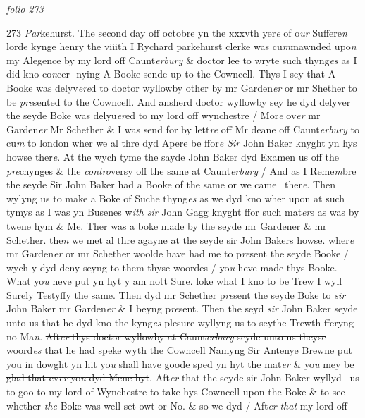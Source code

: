 \documentclass[12pt, a4paper]{book}
\begin{document}
\textit{folio 273}



{\color{Mahogany}273} 
				\marginpar[\vspace{0.5cm}{\textcolor{Gray}{E.}}]{}
			\textit{ Par}kehurst.  The second day off octobre yn the xxxvth yer\textit{e} of o\textit{ur }Suffere\textit{n} lorde kynge henry the viiith I Rychard parkehurst clerke was cu\textit{m}mawnded upo\textit{n} my Alegence by my lord off Caunt\textit{erbury }\& doctor lee to wryte such thyng\textit{es} as I did kno co\textit{n}cer- nying A Booke sende up to the Cowncell. Thys I sey that A Booke was delyv\textit{ere}d to doctor wyllowby other by mr Garden\textit{er} or mr Shether to be \textit{pre}sented to the Cowncell. And ansherd doctor wyllowby sey \sout{he dyd}
               \sout{delyver} the seyde Boke was delyu\textit{er}ed to my lord off wynchestre / Mor\textit{e} ov\textit{er} mr Garden\textit{er} Mr Schether \& I was send for by lett\textit{re} off Mr deane off Caunt\textit{erbury} to cu\textit{m} to london wher we al thre dyd Apere be ffor\textit{e Sir} John Baker knyght yn hys howse ther\textit{e}. At the wych tyme the sayde John Baker dyd Examen us off the \textit{pre}chynges \& the \textit{contro}versy off the same at Caunt\textit{erbury} / And as I Reme\textit{m}bre the seyde Sir John Baker had a Booke of the same or we came  ther\textit{e}. Then wylyng us to make a Boke of Suche thyng\textit{es} as we dyd kno wher upon at such tymys as I was yn Busenes w\textit{ith sir} John Gagg knyght ffor such mat\textit{er}s as was by twene hym \& Me. Ther was a boke made by the seyde mr Gardener \& mr Schether. the\textit{n} we met al thre agayne at the seyde sir John Bakers howse. wher\textit{e} mr Garden\textit{er} or mr Schether woolde have had me to p\textit{re}sent the seyde Booke / wych y dyd deny seyng to them thyse woordes / yo\textit{u} heve made thys Booke. What yo\textit{u} heve put yn  hyt y am nott Sure. loke what I kno to be Trew I wyll Surely Testyffy the same. Then dyd mr Schether p\textit{re}sent the seyde Boke to \textit{sir} John Baker  mr Garden\textit{er} \& I beyng p\textit{re}sent. Then the seyd \textit{sir} John Baker seyde unto us that he dyd kno the kyng\textit{es} plesure wyllyng us to seythe Trewth fferyng  no Ma\textit{n}. \sout{Aft\textit{er} thys doctor wyllowby at Caunt\textit{erbury} seyde unto us theyse woord\textit{es} that he had speke wyth the Cowncell Namyng Sir Antenye Brewne put you in dowght yn hit yo\textit{u} shall have goode sped yn hyt the mat\textit{er} \& yo\textit{u} mey be glad that ev\textit{er} yo\textit{u} dyd Mene hyt}. Aft\textit{er }that the seyde sir John Baker wyllyd  us to goo to my lord of Wynchestre to take hys Cowncell upon the Boke \& to see whether \textit{the} Boke was well set owt or No. \& so we dyd / Aft\textit{er}
               \textit{that} my lord off 
\end{document}
